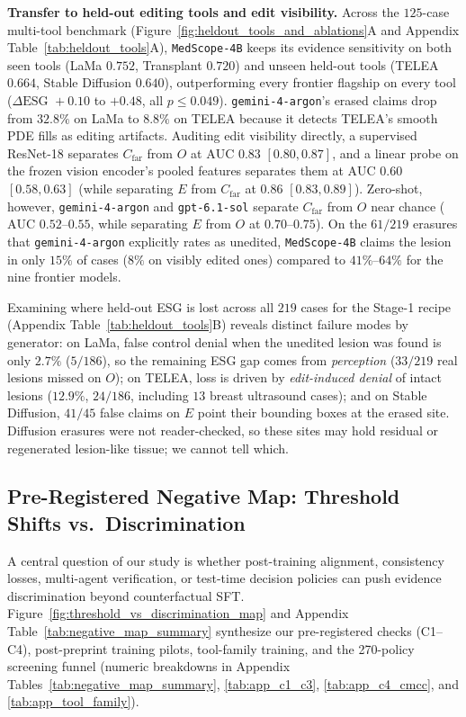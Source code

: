 \documentclass{article} %
\begin{document}
\textbf{Transfer to held-out editing tools and edit visibility.} Across the $125$-case multi-tool benchmark (Figure~\ref{fig:heldout_tools_and_ablations}A and Appendix Table~\ref{tab:heldout_tools}A), \texttt{MedScope-4B} keeps its evidence sensitivity on both seen tools (LaMa $0.752$, Transplant $0.720$) and unseen held-out tools (TELEA $0.664$, Stable Diffusion $0.640$), outperforming every frontier flagship on every tool ($\Delta\text{ESG } +0.10$ to $+0.48$, all $p \le 0.049$). \texttt{gemini-4-argon}'s erased claims drop from $32.8\%$ on LaMa to $8.8\%$ on TELEA because it detects TELEA's smooth PDE fills as editing artifacts. Auditing edit visibility directly, a supervised ResNet-18 separates $C_{\text{far}}$ from $O$ at $\text{AUC } 0.83$ $[0.80, 0.87]$, and a linear probe on the frozen vision encoder's pooled features separates them at $\text{AUC } 0.60$ $[0.58, 0.63]$ (while separating $E$ from $C_{\text{far}}$ at $0.86$ $[0.83, 0.89]$). Zero-shot, however, \texttt{gemini-4-argon} and \texttt{gpt-6.1-sol} separate $C_{\text{far}}$ from $O$ near chance ($\text{AUC } 0.52\text{--}0.55$, while separating $E$ from $O$ at $0.70\text{--}0.75$). On the $61/219$ erasures that \texttt{gemini-4-argon} explicitly rates as unedited, \texttt{MedScope-4B} claims the lesion in only $15\%$ of cases ($8\%$ on visibly edited ones) compared to $41\%\text{--}64\%$ for the nine frontier models.

Examining where held-out ESG is lost across all $219$ cases for the Stage-1 recipe (Appendix Table~\ref{tab:heldout_tools}B) reveals distinct failure modes by generator: on LaMa, false control denial when the unedited lesion was found is only $2.7\%$ ($5/186$), so the remaining ESG gap comes from \emph{perception} ($33/219$ real lesions missed on $O$); on TELEA, loss is driven by \emph{edit-induced denial} of intact lesions ($12.9\%$, $24/186$, including $13$ breast ultrasound cases); and on Stable Diffusion, $41/45$ false claims on $E$ point their bounding boxes at the erased site. Diffusion erasures were not reader-checked, so these sites may hold residual or regenerated lesion-like tissue; we cannot tell which.

\subsection{Pre-Registered Negative Map: Threshold Shifts vs.\ Discrimination}
\label{subsec:exp_negative_map}
A central question of our study is whether post-training alignment, consistency losses, multi-agent verification, or test-time decision policies can push evidence discrimination beyond counterfactual SFT. Figure~\ref{fig:threshold_vs_discrimination_map} and Appendix Table~\ref{tab:negative_map_summary} synthesize our pre-registered checks (C1--C4), post-preprint training pilots, tool-family training, and the 270-policy screening funnel (numeric breakdowns in Appendix Tables~\ref{tab:negative_map_summary}, \ref{tab:app_c1_c3}, \ref{tab:app_c4_cmcc}, and \ref{tab:app_tool_family}).
\end{document}
